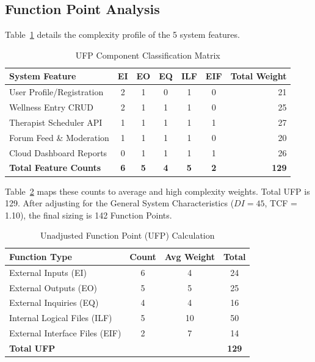 \documentclass[a4paper,11pt]{report}
\begin{document}
\subsection{Function Point Analysis}
Table~\ref{tab:ufp_details} details the complexity profile of the 5 system features.

\begin{table}[H]
\centering
\caption{UFP Component Classification Matrix}
\label{tab:ufp_details}
\begin{tabular}{lcccccr}
\toprule
\textbf{System Feature} & \textbf{EI} & \textbf{EO} & \textbf{EQ} & \textbf{ILF} & \textbf{EIF} & \textbf{Total Weight} \\
\midrule
User Profile/Registration & 2 & 1 & 0 & 1 & 0 & 21 \\
Wellness Entry CRUD & 2 & 1 & 1 & 1 & 0 & 25 \\
Therapist Scheduler API & 1 & 1 & 1 & 1 & 1 & 27 \\
Forum Feed \& Moderation & 1 & 1 & 1 & 1 & 0 & 20 \\
Cloud Dashboard Reports & 0 & 1 & 1 & 1 & 1 & 26 \\
\midrule
\textbf{Total Feature Counts} & \textbf{6} & \textbf{5} & \textbf{4} & \textbf{5} & \textbf{2} & \textbf{129} \\
\bottomrule
\end{tabular}
\end{table}

Table~\ref{tab:ufp} maps these counts to average and high complexity weights. Total UFP is 129. After adjusting for the General System Characteristics ($DI = 45$, TCF = 1.10), the final sizing is 142 Function Points.

\begin{table}[H]
\centering
\caption{Unadjusted Function Point (UFP) Calculation}
\label{tab:ufp}
\begin{tabular}{|l|c|c|c|}
\hline
\textbf{Function Type} & \textbf{Count} & \textbf{Avg Weight} & \textbf{Total} \\ \hline
External Inputs (EI) & 6 & 4 & 24 \\ \hline
External Outputs (EO) & 5 & 5 & 25 \\ \hline
External Inquiries (EQ) & 4 & 4 & 16 \\ \hline
Internal Logical Files (ILF) & 5 & 10 & 50 \\ \hline
External Interface Files (EIF) & 2 & 7 & 14 \\ \hline
\textbf{Total UFP} & & & \textbf{129} \\ \hline
\end{tabular}
\end{table}
\end{document}
